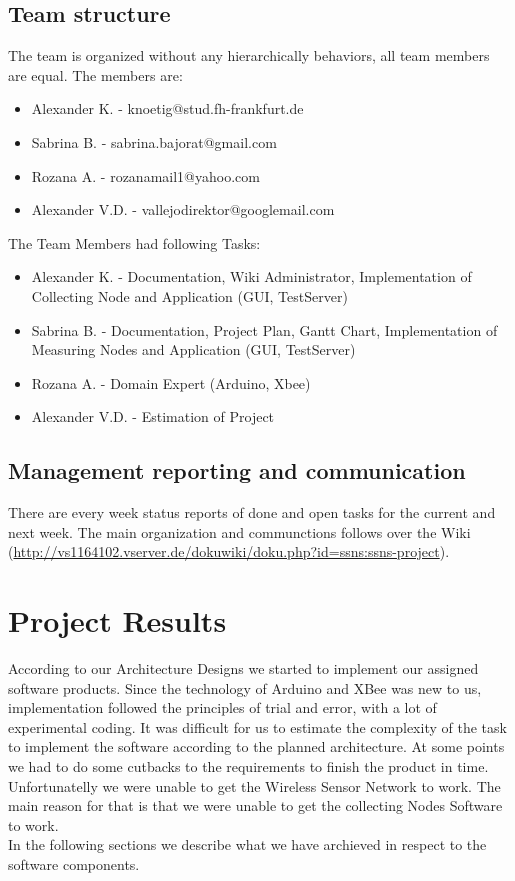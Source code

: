 \documentclass[
	11pt,
	a4paper
]{article}%
\begin{document}
\subsection{Team structure}
The team is organized without any hierarchically behaviors, all team members are equal. The members are:
\begin{itemize}
	\item Alexander K. - knoetig@stud.fh-frankfurt.de
	\item Sabrina B. - sabrina.bajorat@gmail.com
	\item Rozana A. - rozanamail1@yahoo.com
	\item Alexander V.D. - vallejodirektor@googlemail.com
\end{itemize}The Team Members had following Tasks:
\begin{itemize}
	\item Alexander K. - Documentation, Wiki Administrator, Implementation of Collecting Node and Application (GUI, TestServer)
	
	\item Sabrina B. - Documentation, Project Plan, Gantt Chart, Implementation of Measuring Nodes and Application (GUI, TestServer)

	\item Rozana A. - Domain Expert (Arduino, Xbee)

	\item Alexander V.D. - Estimation of Project
\end{itemize}

\subsection{Management reporting and communication}
There are every week status reports of done and open tasks for the current and next week. The main organization and communctions follows over the Wiki (\url{http://vs1164102.vserver.de/dokuwiki/doku.php?id=ssns:ssns-project}).


\section{Project Results}
According to our Architecture Designs we started to implement our assigned software products. Since the technology of Arduino and XBee was new to us, implementation followed the principles of trial and error, with a lot of experimental coding. It was difficult for us to estimate the complexity of the task to implement the software according to the planned architecture. At some points we had to do some cutbacks to the requirements to finish the product in time. Unfortunatelly we were unable to get the Wireless Sensor Network to work. The main reason for that is that we were unable to get the collecting Nodes Software to work.
\\
In the following sections we describe what we have archieved in respect to the software components.
\end{document}
